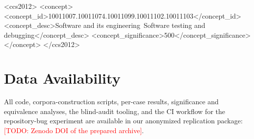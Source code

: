 \documentclass[sigconf,review,anonymous]{acmart}
\newcommand{\todo}[1]{\textcolor{red}{[TODO: #1]}}
\begin{document}
\begin{CCSXML}
<ccs2012>
<concept>
<concept_id>10011007.10011074.10011099.10011102.10011103</concept_id>
<concept_desc>Software and its engineering~Software testing and debugging</concept_desc>
<concept_significance>500</concept_significance>
</concept>
</ccs2012>
\end{CCSXML}


\maketitle










\section*{Data Availability}
All code, corpora-construction scripts, per-case results, significance and
equivalence analyses, the blind-audit tooling, and the CI workflow for the
repository-bug experiment are available in our anonymized replication
package: \todo{Zenodo DOI of the prepared archive}.



\end{document}
